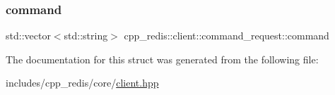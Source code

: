\mbox{\label{structcpp__redis_1_1client_1_1command__request_ab39da4631d0385a62d02cf8e123dcb14}} 
\subsubsection{\texorpdfstring{command}{command}}
{\footnotesize\ttfamily std\+::vector$<$std\+::string$>$ cpp\+\_\+redis\+::client\+::command\+\_\+request\+::command}



The documentation for this struct was generated from the following file\+:\begin{DoxyCompactItemize}
\item 
includes/cpp\+\_\+redis/core/\hyperlink{client_8hpp}{client.\+hpp}\end{DoxyCompactItemize}
